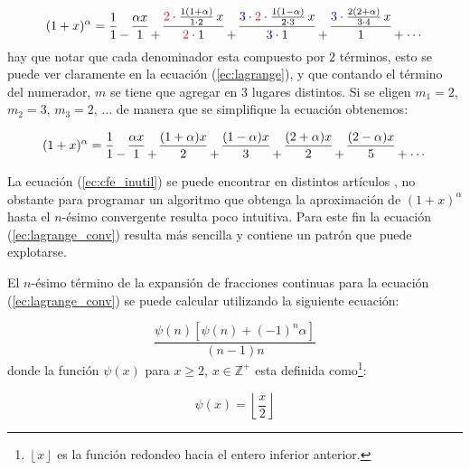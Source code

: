 	\begin{equation}
 		(1 + x)^{\alpha} = \frac{1}{1} \genfrac{}{}{0pt}{0}{}{-} \frac{\alpha x}{1} \genfrac{}{}{0pt}{0}{}{+}  \frac{ {\color{red} 2} \cdot \frac{1(1 + \alpha)}{1\cdot2}\,x}{{\color{red} 2} \cdot 1} \genfrac{}{}{0pt}{0}{}{+} \frac{ {\color{blue} 3} \cdot {\color{red} 2} \cdot \frac{1(1 - \alpha)}{2\cdot3}\,x}{{\color{blue} 3} \cdot 1} \genfrac{}{}{0pt}{0}{}{+} \frac{{\color{blue} 3} \cdot \frac{2(2 + \alpha)}{3\cdot4}\,x}{1}   \genfrac{}{}{0pt}{0}{}{+} \genfrac{}{}{0pt}{0}{}{\cdots} 
	\end{equation}
	hay que notar que cada denominador esta compuesto por 2 términos, esto se puede ver claramente en la ecuación (\ref{ec:lagrange}), y que contando el término del numerador, $m$ se tiene que agregar en 3 lugares distintos. Si se eligen $m_{1} = 2$, $m_{2} = 3$, $m_{3} = 2$, $\ldots$ de manera que se simplifique la ecuación obtenemos:

	\begin{equation}
 		(1 + x)^{\alpha} = \frac{1}{1}  \genfrac{}{}{0pt}{0}{}{-} \frac{\alpha x}{1} \genfrac{}{}{0pt}{0}{}{+} \frac{(1 + \alpha)x}{2} \genfrac{}{}{0pt}{0}{}{+} \frac{(1 - \alpha)x}{3} \genfrac{}{}{0pt}{0}{}{+} \frac{(2 + \alpha)x}{2} \genfrac{}{}{0pt}{0}{}{+} \frac{(2-\alpha)x}{5} \genfrac{}{}{0pt}{0}{}{+} \genfrac{}{}{0pt}{0}{}{\cdots}
 		\label{ec:cfe_inutil}
	\end{equation}

	La ecuación (\ref{ec:cfe_inutil}) se puede encontrar en distintos artículos \cite{Krishna2008,Krishna2011}, no obstante para programar un algoritmo que obtenga la aproximación de $(1 + x)^{\alpha}$ hasta el $n$-ésimo convergente resulta poco intuitiva. Para este fin la ecuación (\ref{ec:lagrange_conv}) resulta más sencilla y contiene un patrón que puede explotarse.

	El $n$-ésimo término de la expansión de fracciones continuas para la ecuación (\ref{ec:lagrange_conv}) se puede calcular utilizando la siguiente ecuación:

	\begin{equation}
		\frac{\psi(n) \left[ \psi(n) + (-1)^{n} \alpha \right]}{(n-1)n}
		\label{ec:calculo_terminos_cfe}
	\end{equation}
	donde la función $\psi(x)$ para $x\geq2$, $x\in \mathbb{Z}^{+}$ esta definida como\footnote{$\left\lfloor x\right\rfloor$ es  la función redondeo hacia el entero inferior anterior.}:

	\begin{equation}
		\psi(x) = \left\lfloor \frac{x}{2}\right\rfloor
	\end{equation}

